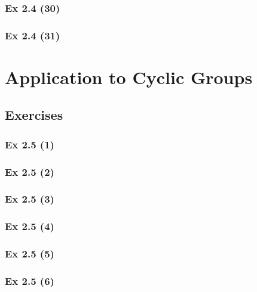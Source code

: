 \subsubsection{Ex 2.4 (30)}\label{sec:Ex_2.4.30}

\subsubsection{Ex 2.4 (31)}\label{sec:Ex_2.4.31}

\newpage		%

\section{Application to Cyclic Groups}\label{sec:2.5}
\subsection{Exercises}\label{sec:2.5_Exercises}

\subsubsection{Ex 2.5 (1)}\label{sec:Ex_2.5.1}

\subsubsection{Ex 2.5 (2)}\label{sec:Ex_2.5.2}

\subsubsection{Ex 2.5 (3)}\label{sec:Ex_2.5.3}

\subsubsection{Ex 2.5 (4)}\label{sec:Ex_2.5.4}

\subsubsection{Ex 2.5 (5)}\label{sec:Ex_2.5.5}

\subsubsection{Ex 2.5 (6)}\label{sec:Ex_2.5.6}

